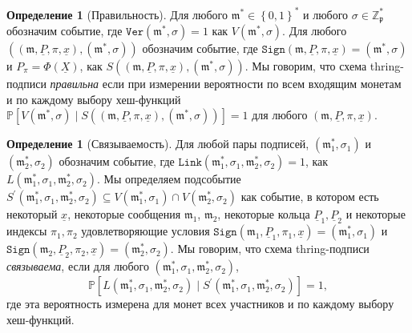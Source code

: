 \documentclass{mrl}
\theoremstyle{definition}
\numberwithin{theorem}{subsection}
\newtheorem{defn}[theorem]{Определение}
\newcommand{\m}{\mathfrak{m}}
\begin{document}
\begin{defn}[Правильность]
Для любого $\m^* \in \left\{0,1\right\}^*$ и любого $\sigma \in \mathbb{Z}_{\mathfrak{p}}^*$ обозначим событие, где $\texttt{Ver}(\m^*, \sigma) = 1$ как $V(\m^*, \sigma)$. Для любого $((\m, \underline{P}, \pi, \underline{x}), (\m^*, \sigma))$ обозначим событие, где $\texttt{Sign}(\m, \underline{P}, \pi, \underline{x}) = (\m^*, \sigma)$ и $P_\pi = \Phi(\underline{X})$, как $S\left((\m, \underline{P}, \pi, \underline{x}), (\m^*, \sigma)\right)$. Мы говорим, что схема thring-подписи \textit{правильна} если при измерении вероятности по всем входящим монетам и по каждому выбору хеш-функций $\mathbb{P}\left[ V(\m^*, \sigma) \mid S\left((\m, \underline{P}, \pi, \underline{x}), (\m^*, \sigma)\right)\right] = 1$ для любого $(\m, \underline{P}, \pi, \underline{x})$.
\end{defn}

\begin{defn}[Связываемость]
Для любой пары подписей, $(\m^*_1, \sigma_1)$ и $(\m^*_2, \sigma_2)$ обозначим событие, где $\texttt{Link}(\m^*_1, \sigma_1, \m^*_2, \sigma_2) = 1$, как $L(\m^*_1, \sigma_1, \m^*_2, \sigma_2)$. Мы определяем подсобытие $S^{\prime}(\m^*_1, \sigma_1, \m^*_2, \sigma_2) \subseteq V(\m^*_1, \sigma_1) \cap V(\m^*_2, \sigma_2)$ как событие, в котором есть некоторый $\underline{x}$, некоторые сообщения $\m_1$, $\m_2$, некоторые кольца $\underline{P}_1, \underline{P}_2$ и некоторые индексы $\pi_1, \pi_2$ удовлетворяющие условия $\texttt{Sign}(\m_1, \underline{P}_1, \pi_1, \underline{x}) = (\m^*_1, \sigma_1)$ и $\texttt{Sign}(\m_2, \underline{P}_2, \pi_2, \underline{x}) = (\m^*_2, \sigma_2)$. Мы говорим, что схема thring-подписи \textit{связываема}, если для любого $(\m^*_1, \sigma_1, \m^*_2, \sigma_2)$, \[\mathbb{P}\left[L(\m^*_1, \sigma_1, \m^*_2, \sigma_2)\mid S^{\prime}(\m^*_1, \sigma_1, \m^*_2, \sigma_2)\right] = 1,\] где эта вероятность измерена для монет всех участников и по каждому выбору хеш-функций.
\end{defn}
\end{document}

